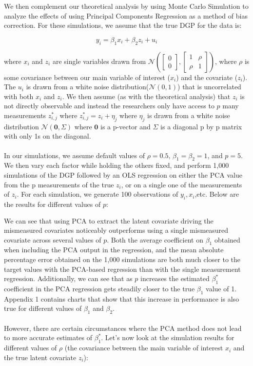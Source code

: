 \documentclass[12pt]{article}
\begin{document}
        We then complement our theoretical analysis by using Monte Carlo Simulation to analyze the effects of using Principal Components Regression as a method of bias correction. For these simulations, we assume that the true DGP for the data is:

        $$y_i = \beta_1 x_i + \beta_2 z_i + u_i$$

        where $x_i$ and $z_i$ are single variables drawn from $\mathcal{N}(\begin{bmatrix} 0\\ 0 \end{bmatrix}, \begin{bmatrix} 1 & \rho\\ \rho & 1\end{bmatrix})$, where $\rho$ is some covariance between our main variable of interest ($x_i$) and the covariate ($z_i$). The $u_i$ is drawn from a white noise distribution($\mathcal{N}(0,1)$) that is uncorrelated with both $x_i$ and $z_i$. We then assume (as with the theoretical analysis) that $z_i$ is not directly observable and instead the researchers only have access to $p$ many measurements $z_{i,j}^*$ where $z_{i,j}^* = z_i + \eta_j$ where $\eta_j$ is drawn from a white noise distribution $\mathcal{N}(\mathbf{0},\Sigma)$ where $\mathbf{0}$ is a p-vector and $\Sigma$ is a diagonal p by p matrix with only 1s on the diagonal.\\
        \\
        In our simulations, we assume default values of $\rho = 0.5$, $\beta_1 = \beta_2 = 1$, and $p=5$. We then vary each factor while holding the others fixed, and perform 1,000 simulations of the DGP followed by an OLS regression on either the PCA value from the p measurements of the true $z_i$, or on a single one of the measurements of $z_i$. For each simulation, we generate 100 observations of $y_i,x_i$,etc. Below are the results for different values of $p$:

        

        We can see that using PCA to extract the latent covariate driving the mismeasured covariates noticeably outperforms using a single mismeasured covariate across several values of $p$. Both the average coefficient on $\beta_1$ obtained when including the PCA output in the regression, and the mean absolute percentage error obtained on the 1,000 simulations are both much closer to the target values with the PCA-based regression than with the single measurement regression. Additionally, we can see that as $p$ increases the estimated $\beta_1^*$ coefficient in the PCA regression gets steadily closer to the true $\beta_1$ value of 1. Appendix 1 contains charts that show that this increase in performance is also true for different values of $\beta_1$ and $\beta_2$.\\
        \\
        However, there are certain circumstances where the PCA method does not lead to more accurate estimates of $\beta_1^*$. Let's now look at the simulation results for different values of $\rho$ (the covariance between the main variable of interest $x_i$ and the true latent covariate $z_i$):
\end{document}
